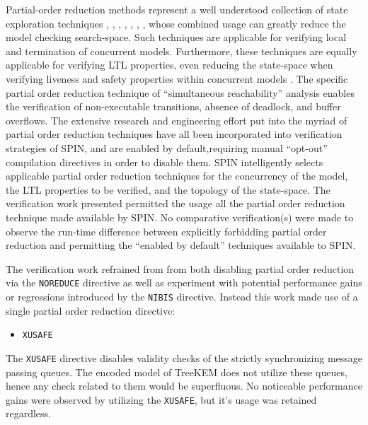 Partial-order reduction methods represent a well understood collection of state exploration techniques \autocite{godefroid1990using}, \autocite{godefroid1991using}, \autocite{godefroid1994partial}, \autocite{holzmann1995improvement}, \autocite{katz1992verification}, \autocite{peled1993all}, \autocite{valmari1989stubborn}, \autocite{valmari1992stubborn} whose combined usage can greatly reduce the model checking search-space.
Such techniques are applicable for verifying local and termination of concurrent models.
Furthermore, these techniques are equally applicable for verifying LTL properties, even reducing the state-space when verifying liveness and safety properties within concurrent models \autocite{wolper1983reasoning}.
The specific partial order reduction technique of ``simultaneous reachability'' analysis \autocite{van1997partial} enables the verification of non-executable transitions, absence of deadlock, and buffer overflows.
The extensive research and engineering effort put into the myriad of partial order reduction techniques have all been incorporated into verification strategies of SPIN, and are enabled by default,requiring manual ``opt-out'' compilation directives in order to disable them.
SPIN intelligently selects applicable partial order reduction techniques for the concurrency of the model, the LTL properties to be verified, and the topology of the state-space.
The verification work presented permitted the usage all the partial order reduction technique made available by SPIN.
No comparative verification(s) were made to observe the run-time difference between explicitly forbidding partial order reduction and permitting the ``enabled by default'' techniques available to SPIN.

The verification work refrained from from both disabling partial order reduction via the \texttt{NOREDUCE} directive as well as experiment with potential performance gains or regressions introduced by the \texttt{NIBIS} directive.
Instead this work made use of a single partial order reduction directive:

\begin{itemize}
\item \texttt{XUSAFE}
\end{itemize}

The \texttt{XUSAFE} directive disables validity checks of the strictly synchronizing message passing queues.
The encoded model of TreeKEM does not utilize these queues, hence any check related to them would be superfluous.
No noticeable performance gains were observed by utilizing the \texttt{XUSAFE}, but it's usage was retained regardless.


